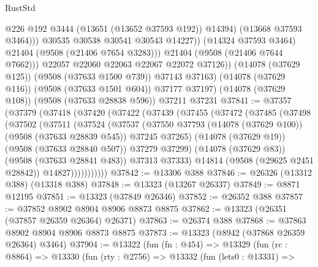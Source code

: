 \begin{lexlean}{RustStd}
\begin{coremodule}
                          @226
                          @192
                          @3444
                          (@13651 (@13652 @37593 @192))
                          @14394)
                        (@13668 @37593 @3464)))
                    @30535
                    @30538
                    @30541
                    @30543
                    @14227))
                (@14324 @37593 @3464)
                @21404
                (@9508 (@21406 @7654 @3283)))
              @21404
              (@9508 (@21406 @7644 @7662)))
            @22057
            @22060
            @22063
            @22067
            @22072
            @37126))
        (@14078 (@37629 @125))
        (@9508 (@37633 @1500 @739))
        @37143
        @37163)
      (@14078 (@37629 @116))
      (@9508 (@37633 @1501 @604))
      @37177
      @37197)
    (@14078 (@37629 @108))
    (@9508 (@37633 @28838 @596))
    @37211
    @37231
@37841 := @37357
    (@37379
      (@37418
        (@37420
          (@37422
            (@37439
              (@37455
                (@37472
                  (@37485
                    (@37498
                      (@37502
                        (@37511
                          (@37524
                            (@37537
                              (@37550
                                @37793
                                (@14078 (@37629 @100))
                                (@9508 (@37633 @28839 @545))
                                @37245
                                @37265)
                              (@14078 (@37629 @19))
                              (@9508 (@37633 @28840 @507))
                              @37279
                              @37299)
                            (@14078 (@37629 @83))
                            (@9508 (@37633 @28841 @483))
                            @37313
                            @37333)
                          @14814
                          (@9508 (@29625 @2451 @28842))
                          @14827)))))))))))
@37842 := @13306 @388
@37846 := @26326 (@13312 @388) (@13318 @388)
@37848 := @13323 (@13267 @26337)
@37849 := @8871 @12195
@37851 := @13323 (@37849 @26346)
@37852 := @26352 @388
@37857 := @37852 @8902 @8904 @8906 @8873 @8875
@37862 := @13323 (@26351 (@37857 @26359 @26364) @26371)
@37863 := @26374 @388
@37868 := @37863 @8902 @8904 @8906 @8873 @8875
@37873 := @13323 (@8942 (@37868 @26359 @26364) @3464)
@37904 := @13322
    (fun (fn : @454) =>
    @13329
      (fun (rc : @8864) =>
      @13330
        (fun (rty : @2756) =>
        @13332
          (fun (lets0 : @13331) =>

\end{coremodule}
\end{lexlean}
